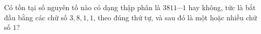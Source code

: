 \ifshowproblem
\begin{problem}\label{example:BxMO-2015-P3}
    Có tồn tại số nguyên tố nào có dạng thập phân là \( 3811\cdots1 \) hay không,  
    tức là bắt đầu bằng các chữ số \( 3, 8, 1, 1 \), theo đúng thứ tự, và sau đó là một hoặc nhiều chữ số \( 1 \)?
\end{problem}
\fi

\footnotemark
{}
\fi